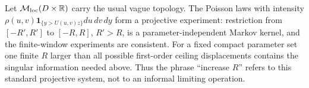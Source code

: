 \begin{remark}
\label{rem:v24-projective-poisson}
Let \(\mathcal M_{\rm loc}(D\times\mathbb R)\) carry the usual vague topology.
The Poisson laws with intensity
\(\rho(u,v)\mathbf1_{\{y>U(u,v)z\}}du\,dv\,dy\) form a projective experiment:
restriction from \([-R',R']\) to \([-R,R]\), \(R'>R\), is a
parameter-independent Markov kernel, and the finite-window experiments are
consistent.  For a fixed compact parameter set one finite \(R\) larger than
all possible first-order ceiling displacements contains the singular
information needed above.  Thus the phrase ``increase \(R\)'' refers to this
standard projective system, not to an informal limiting operation.
\end{remark}
